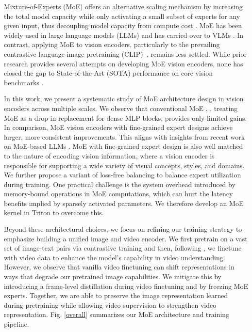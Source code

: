 \documentclass[runningheads]{llncs}
\begin{document}
Mixture-of-Experts (MoE) offers an alternative scaling mechanism by increasing the total model capacity while only activating a small subset of experts for any given input, thus decoupling model capacity from compute cost \cite{original_moe}. MoE has been widely used in large language models (LLMs) \cite{deepseekv3,gptoss,kimik2,qwen3,mixtral} and has carried over to VLMs \cite{qwen3vl,kimi2p5,seed1p5vl,moe_llava,gemini2p5}. In contrast, applying MoE to vision encoders, particularly to the prevailing contrastive language-image pretraining (CLIP)~\cite{clip}, remains less settled. While prior research provides several attempts on developing MoE vision encoders, none has closed the gap to State-of-the-Art (SOTA) performance on core vision benchmarks \cite{moe_cumo,clip_moe,liemoe,moe_clipup,vmoe}. 

In this work, we present a systematic study of MoE architecture design in vision encoders across multiple scales. We observe that conventional MoE \cite{original_moe}, \ie, treating MoE as a drop-in replacement for dense MLP blocks, provides only limited gains. In comparison, MoE vision encoders with fine-grained expert designs achieve larger, more consistent improvements. This aligns with insights from recent work on MoE-based LLMs \cite{deepseekv3}. MoE with fine-grained expert design is also well matched to the nature of encoding vision information, where a vision encoder is responsible for supporting a wide variety of visual concepts, styles, and domains. We further propose a variant of loss-free balancing \cite{aux_free} to balance expert utilization during training. One practical challenge is the system overhead introduced by memory-bound operations in MoE computations, which can hurt the latency benefits implied by sparsely activated parameters. We therefore develop an MoE kernel in Triton \cite{triton} to overcome this. 

Beyond these architectural choices, we focus on refining our training strategy to emphasize building a unified image and video encoder. We first pretrain on a vast set of image-text pairs via contrastive training and then, following \cite{pe}, we finetune with video data to enhance the model's capability in video understanding. However, we observe that vanilla video finetuning can shift representations in ways that degrade our pretrained image capabilities. We mitigate this by introducing a frame-level distillation during video finetuning and by freezing MoE experts. Together, we are able to preserve the image representation learned during pretraining while allowing video supervision to strengthen video representation. Fig. \ref{overall} summarizes our MoE architecture and training pipeline.
\end{document}
